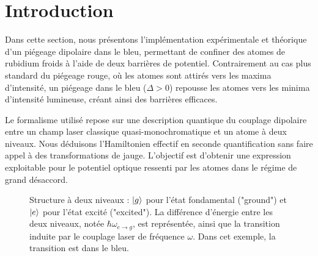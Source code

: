 
\section*{Introduction}

Dans cette section, nous présentons l’implémentation expérimentale et théorique d’un piégeage dipolaire dans le bleu, permettant de confiner des atomes de rubidium froids à l’aide de deux barrières de potentiel. Contrairement au cas plus standard du piégeage rouge, où les atomes sont attirés vers les maxima d’intensité, un piégeage dans le bleu ($\Delta > 0$) repousse les atomes vers les minima d’intensité lumineuse, créant ainsi des barrières efficaces.

Le formalisme utilisé repose sur une description quantique du couplage dipolaire entre un champ laser classique quasi-monochromatique et un atome à deux niveaux. Nous déduisons l’Hamiltonien effectif en seconde quantification sans faire appel à des transformations de jauge. L’objectif est d’obtenir une expression exploitable pour le potentiel optique ressenti par les atomes dans le régime de grand désaccord.

\begin{figure}[!htb]
\centering
{}
\caption{Structure à deux niveaux : $\ket{g}$ pour l’état fondamental ("ground") et $\ket{e}$ pour l’état excité ("excited"). La différence d’énergie entre les deux niveaux, notée $\hbar \omega_{e \rightarrow g}$, est représentée, ainsi que la transition induite par le couplage laser de fréquence $\omega$. Dans cet exemple, la transition est dans le bleu.}

\end{figure}


